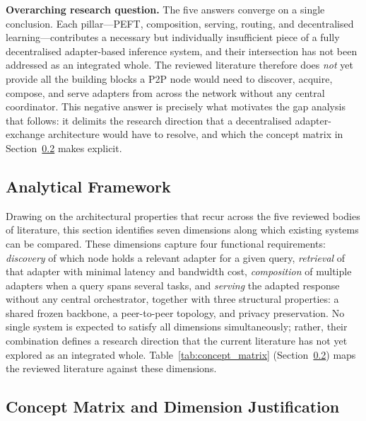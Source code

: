 \noindent\textbf{Overarching research question.} The five answers converge on
a single conclusion. Each pillar---PEFT, composition, serving, routing, and
decentralised learning---contributes a necessary but individually insufficient
piece of a fully decentralised adapter-based inference system, and their
intersection has not been addressed as an integrated whole. The reviewed
literature therefore does \textit{not} yet provide all the building blocks a
P2P node would need to discover, acquire, compose, and serve adapters from
across the network without any central coordinator. This negative answer is
precisely what motivates the gap analysis that follows: it delimits the
research direction that a decentralised adapter-exchange architecture would
have to resolve, and which the concept matrix in
Section~\ref{sec:synthesis_gap:matrix} makes explicit.

\subsection{Analytical Framework}
\label{sec:synthesis_gap:formulation}

Drawing on the architectural properties that recur across the five reviewed bodies of literature, this section identifies seven dimensions along which existing systems can be compared. These dimensions capture four functional requirements: \textit{discovery} of which node holds a relevant adapter for a given query, \textit{retrieval} of that adapter with minimal latency and bandwidth cost, \textit{composition} of multiple adapters when a query spans several tasks, and \textit{serving} the adapted response without any central orchestrator, together with three structural properties: a shared frozen backbone, a peer-to-peer topology, and privacy preservation. No single system is expected to satisfy all dimensions simultaneously; rather, their combination defines a research direction that the current literature has not yet explored as an integrated whole. Table~\ref{tab:concept_matrix} (Section~\ref{sec:synthesis_gap:matrix}) maps the reviewed literature against these dimensions.

\subsection{Concept Matrix and Dimension Justification}
\label{sec:synthesis_gap:matrix}

